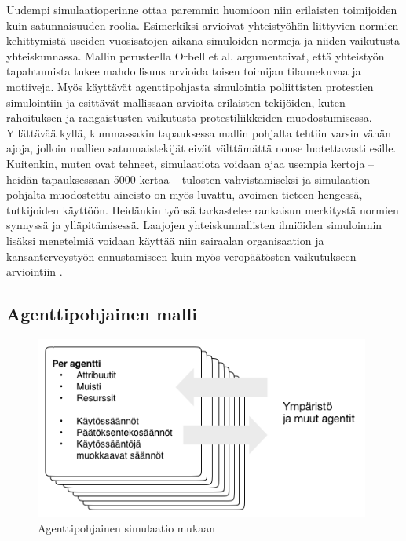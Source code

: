 \documentclass[finnish,gradu,twoside,12pt]{tktltiki}
\begin{document}
Uudempi simulaatioperinne ottaa paremmin huomioon niin erilaisten toimijoiden kuin satunnaisuuden roolia. Esimerkiksi \citet{orbell2004machiavellian} arvioivat yhteistyöhön liittyvien normien kehittymistä useiden vuosisatojen aikana simuloiden normeja ja niiden vaikutusta yhteiskunnassa. Mallin perusteella Orbell et al. argumentoivat, että yhteistyön tapahtumista tukee mahdollisuus arvioida toisen toimijan tilannekuvaa ja motiiveja. Myös \citet{altaweel2012mobilizing} käyttävät agenttipohjasta simulointia poliittisten protestien simulointiin ja esittävät mallissaan arvioita erilaisten tekijöiden, kuten rahoituksen ja rangaistusten vaikutusta protestiliikkeiden muodostumisessa. Yllättävää kyllä, kummassakin tapauksessa mallin pohjalta tehtiin varsin vähän ajoja, jolloin mallien satunnaistekijät eivät välttämättä nouse luotettavasti esille. Kuitenkin, muten \citet{Villatoro2013} ovat tehneet, simulaatiota voidaan ajaa usempia kertoja -- heidän tapauksessaan 5000 kertaa -- tulosten vahvistamiseksi ja simulaation pohjalta muodostettu aineisto on myös luvattu, avoimen tieteen hengessä, tutkijoiden käyttöön. Heidänkin työnsä tarkastelee rankaisun merkitystä normien synnyssä ja ylläpitämisessä. Laajojen yhteiskunnallisten ilmiöiden simuloinnin lisäksi menetelmiä voidaan käyttää niin sairaalan organisaation ja kansanterveystyön ennustamiseen \citep{Pearson2011} kuin myös veropäätösten vaikutukseen arviointiin \citep{bloomquist2006comparison}.

 
\subsection{Agenttipohjainen malli}

\begin{figure}
\includegraphics[height=6cm]{images/agenttimalli.png} 
\caption{Agenttipohjainen simulaatio \citet{Macal2009} mukaan}
\end{figure}
\end{document}
